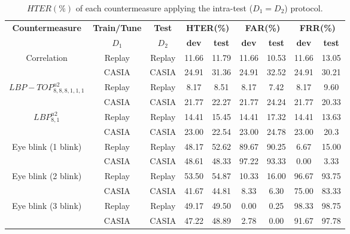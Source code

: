 \hspace{-17mm}\begin{table}[ht!]
\caption{$HTER(\%)$ of each countermeasure applying the intra-test ($D_1=D_2$) protocol.}
\begin{center}
  \begin{tabular}{ | c | c | c | c  c | c  c  | c  c |}
    \hline

   \multirow{2}{*}{\textbf{Countermeasure}} & \textbf{Train/Tune} & \textbf{Test} & \multicolumn{2}{c|}{\textbf{HTER(\%)}} & \multicolumn{2}{c|}{\textbf{FAR(\%)}} & \multicolumn{2}{c|}{\textbf{FRR(\%)}} \\ 
     & $D_1$ & $D_2$ & \textbf{dev} & \textbf{test} & \textbf{dev} & \textbf{test} & \textbf{dev} & \textbf{test}  \\ \hline
    
    \multirow{2}{*}{Correlation} & Replay  & Replay  &  11.66 & 11.79  & 11.66 &  10.53 & 11.66  & 13.05\\ 
               & CASIA &  CASIA  & 24.91 & 31.36 & 24.91 & 32.52 & 24.91 & 30.21\\ \hline \hline

    \multirow{2}{*}{$LBP-TOP_{8,8,8,1,1,1}^{u2}$}  & Replay & Replay  & 8.17 & 8.51  & 8.17& 7.42 & 8.17 & 9.60\\
               & CASIA  & CASIA  & 21.77 & 22.27 & 21.77& 24.24 & 21.77 & 20.33\\ \hline \hline

    \multirow{2}{*}{$LBP_{8,1}^{u2}$} & Replay  & Replay  & 14.41 &15.45 & 14.41 & 17.32 & 14.41 & 13.63 \\
               & CASIA  & CASIA  & 23.00  & 22.54 & 23.00 & 24.78 & 23.00 & 20.3\\ \hline \hline
            
    \multirow{2}{*}{Eye blink (1 blink)} & Replay  & Replay  & 48.17 & 52.62 & 89.67 & 90.25 & 6.67 & 15.00\\
               & CASIA  & CASIA  & 48.61 &48.33 & 97.22 & 93.33 & 0.00 & 3.33 \\ \hline \hline

    \multirow{2}{*}{Eye blink (2 blink)} & Replay  & Replay  & 53.50 & 54.87 & 10.33 & 16.00 & 96.67 & 93.75\\
               & CASIA  & CASIA  & 41.67 & 44.81 & 8.33 & 6.30 & 75.00 & 83.33 \\ \hline \hline

    \multirow{2}{*}{Eye blink (3 blink)} & Replay  & Replay  & 49.17 & 49.50 & 0.00 & 0.25& 98.33 & 98.75\\
               & CASIA  & CASIA  & 47.22  & 48.89 & 2.78 & 0.00 & 91.67 & 97.78\\
    \hline
  \end{tabular}
\end{center}
\label{tb:IntraTest}
\end{table}

